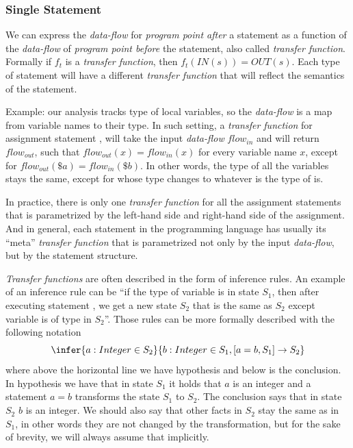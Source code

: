         \subsubsection*{Single Statement}
        
        We can express the \emph{data-flow} for \emph{program point after} 
        a statement as a function of the \emph{data-flow} of 
        \emph{program point before} the statement, also called \emph{transfer function}. 
        Formally if $f_t$ is a \emph{transfer function}, then $f_t(IN(s))=OUT(s)$.
        Each type of statement will have a different \emph{transfer function} 
        that will reflect the semantics of the statement. 
        
        Example: our analysis tracks type of local variables, so the \emph{data-flow} 
        is a map from variable names to their type. In such setting, a \emph{transfer function} 
        for assignment statement , will take the input \emph{data-flow} 
        $flow_{in}$ and will return $flow_{out}$, such that $flow_{out}(x)=flow_{in}(x)$ for 
        every variable name $x$, except for $flow_{out}(\$a)=flow_{in}(\$b)$. In other words, 
        the type of all the variables stays the same, except for  whose type 
        changes to whatever is the type of  is. 
        
        In practice, there is only one \emph{transfer function} for all the assignment 
        statements that is parametrized by the left-hand side and right-hand side of 
        the assignment. And in general, each statement in the programming language has 
        usually its ``meta'' \emph{transfer function} that is parametrized not only 
        by the input \emph{data-flow}, but by the statement structure.
        
        \emph{Transfer functions} are often described in the form of inference rules. 
        An example of an inference rule can be 
        ``if the type of variable  is  in state $S_1$, 
        then after executing statement , we get a new state $S_2$ that 
        is the same as $S_2$ except variable  is of type  in $S_2$''. 
        Those rules can be more formally described with the following notation        
        $$
        \infer{a:Integer\in{}S_2}{b:Integer \in S_1, [a=b, S_1] \rightarrow S_2}
        $$        
        where above the horizontal line we have hypothesis and below is 
        the conclusion. In hypothesis we have that in state $S_1$ it 
        holds that $a$ is an integer and a statement $a=b$ transforms 
        the state $S_1$ to $S_2$. The conclusion says that in state 
        $S_2$ $b$ is an integer. We should also say that other 
        facts in $S_2$ stay the same as in $S_1$, in other words they 
        are not changed by the transformation, but for the sake 
        of brevity, we will always assume that implicitly.
        
